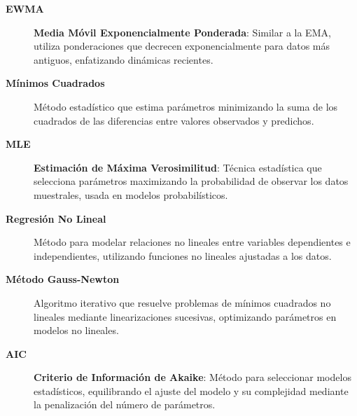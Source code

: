 \begin{description}
\item[\textbf{EWMA}] 
\textbf{Media Móvil Exponencialmente Ponderada}:  
Similar a la EMA, utiliza ponderaciones que decrecen exponencialmente para datos más antiguos, enfatizando dinámicas recientes.

\item[\textbf{Mínimos Cuadrados}] 
Método estadístico que estima parámetros minimizando la suma de los cuadrados de las diferencias entre valores observados y predichos.

\item[\textbf{MLE}] 
\textbf{Estimación de Máxima Verosimilitud}:  
Técnica estadística que selecciona parámetros maximizando la probabilidad de observar los datos muestrales, usada en modelos probabilísticos.

\item[\textbf{Regresión No Lineal}] 
Método para modelar relaciones no lineales entre variables dependientes e independientes, utilizando funciones no lineales ajustadas a los datos.

\item[\textbf{Método Gauss-Newton}] 
Algoritmo iterativo que resuelve problemas de mínimos cuadrados no lineales mediante linearizaciones sucesivas, optimizando parámetros en modelos no lineales.

\end{description}
\begin{description}
\item[\textbf{AIC}] 
\textbf{Criterio de Información de Akaike}:  
Método para seleccionar modelos estadísticos, equilibrando el ajuste del modelo y su complejidad mediante la penalización del número de parámetros.

\end{description}

